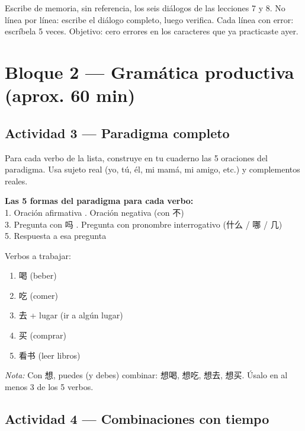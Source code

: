 \documentclass[12pt, a4paper]{article}
\begin{document}
Escribe de memoria, sin referencia, los seis diálogos de las lecciones 7 y 8. No línea por línea: escribe el diálogo completo, luego verifica. Cada línea con error: escríbela 5 veces. Objetivo: cero errores en los caracteres que ya practicaste ayer.

\newpage

\section{Bloque 2 — Gramática productiva (aprox. 60 min)}

\subsection{Actividad 3 — Paradigma completo}

Para cada verbo de la lista, construye en tu cuaderno las 5 oraciones del paradigma. Usa sujeto real (yo, tú, él, mi mamá, mi amigo, etc.) y complementos reales.

\begin{cuadrogris}
\textbf{Las 5 formas del paradigma para cada verbo:}\\
1. Oración afirmativa . Oración negativa (con 不)\\
3. Pregunta con 吗 . Pregunta con pronombre interrogativo (什么 / 哪 / 几)\\
5. Respuesta a esa pregunta
\end{cuadrogris}

\noindent Verbos a trabajar:

\begin{enumerate}[leftmargin=1.5cm]
\item 喝 (beber)
\item 吃 (comer)
\item 去 + lugar (ir a algún lugar)
\item 买 (comprar)
\item 看书 (leer libros)
\end{enumerate}

\textit{Nota:} Con 想, puedes (y debes) combinar: 想喝, 想吃, 想去, 想买. Úsalo en al menos 3 de los 5 verbos.

\subsection{Actividad 4 — Combinaciones con tiempo}
\end{document}
